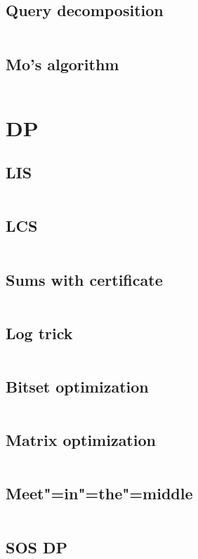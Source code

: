 ﻿\documentclass[10pt,twocolumn,oneside]{article}
\begin{document}
\subsection{Query decomposition}
\inputminted[breaklines]{cpp}{SQRT heuristics/query decomposition.cpp}
\subsection{Mo's algorithm}
\inputminted[breaklines]{cpp}{SQRT heuristics/mo's algorithm.cpp}

\section{DP}
\subsection{LIS}
\inputminted[breaklines]{cpp}{DP/lis.cpp}
\subsection{LCS}
\inputminted[breaklines]{python}{DP/lcs.py}
\subsection{Sums with certificate}
\inputminted[breaklines]{python}{DP/sums with certificate.py}
\subsection{Log trick}
\inputminted[breaklines]{cpp}{DP/log-trick.cpp}
\subsection{Bitset optimization}
\inputminted[breaklines]{cpp}{DP/bitset optimization.cpp}
\subsection{Matrix optimization}
\inputminted[breaklines]{cpp}{DP/matrix optimization.cpp}
\subsection{Meet"=in"=the"=middle}
\inputminted[breaklines]{cpp}{DP/meet-in-the-middle.cpp}
\subsection{SOS DP}
\inputminted[breaklines]{cpp}{DP/sos-dp.cpp}
\end{document}
